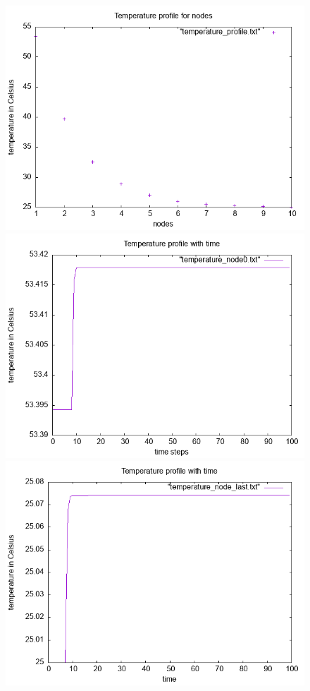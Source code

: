 \documentclass{article}
\begin{document}
\begin{figure}[ht]
\centering
\includegraphics[scale = 0.5]{temperature_profile.png}
\includegraphics[scale =0.5]{temperature_node0.png}
\includegraphics[scale =0.5]{temperature_node_last.png}

\end{figure}
\end{document}
